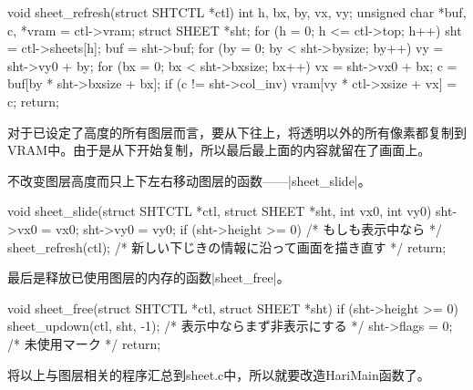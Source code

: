 \begin{code}
void sheet_refresh(struct SHTCTL *ctl)
{
	int h, bx, by, vx, vy;
	unsigned char *buf, c, *vram = ctl->vram;
	struct SHEET *sht;
	for (h = 0; h <= ctl->top; h++) {
		sht = ctl->sheets[h];
		buf = sht->buf;
		for (by = 0; by < sht->bysize; by++) {
			vy = sht->vy0 + by;
			for (bx = 0; bx < sht->bxsize; bx++) {
				vx = sht->vx0 + bx;
				c = buf[by * sht->bxsize + bx];
				if (c != sht->col_inv) {
					vram[vy * ctl->xsize + vx] = c;
				}
			}
		}
	}
	return;
}
\end{code}

对于已设定了高度的所有图层而言，要从下往上，将透明以外的所有像素都复制到VRAM中。由于是从下开始复制，所以最后最上面的内容就留在了画面上。

\cs

不改变图层高度而只上下左右移动图层的函数——|sheet_slide|。

\begin{code}
void sheet_slide(struct SHTCTL *ctl, struct SHEET *sht, int vx0, int vy0)
{
	sht->vx0 = vx0;
	sht->vy0 = vy0;
	if (sht->height >= 0) { /* もしも表示中なら */
		sheet_refresh(ctl); /* 新しい下じきの情報に沿って画面を描き直す */
	}
	return;
}
\end{code}

最后是释放已使用图层的内存的函数|sheet_free|。

\begin{code}
void sheet_free(struct SHTCTL *ctl, struct SHEET *sht)
{
	if (sht->height >= 0) {
		sheet_updown(ctl, sht, -1); /* 表示中ならまず非表示にする */
	}
	sht->flags = 0; /* 未使用マーク */
	return;
}
\end{code}

\cs
将以上与图层相关的程序汇总到sheet.c中，所以就要改造HariMain函数了。

